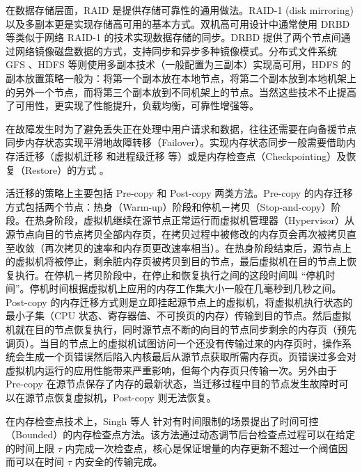 在数据存储层面，RAID \cite{Patterson:1988:CRA:50202.50214} 是提供存储可靠性的通用做法。RAID-1 (disk mirroring) 以及多副本更是实现存储高可用的基本方式。双机高可用设计中通常使用 DRBD \cite{DRBD:2015} 等类似于网络 RAID-1 的技术实现数据存储的同步。DRBD 提供了两个节点间通过网络镜像磁盘数据的方式，支持同步和异步多种镜像模式。分布式文件系统 GFS \cite{Ghemawat:2003:GFS:945445.945450}、HDFS \cite{Hadoop} 等则使用多副本技术（一般配置为三副本）实现高可用，HDFS 的副本放置策略一般为：将第一个副本放在本地节点，将第二个副本放到本地机架上的另外一个节点，而将第三个副本放到不同机架上的节点。当然这些技术不止提高了可用性，更实现了性能提升，负载均衡，可靠性增强等。

在故障发生时为了避免丢失正在处理中用户请求和数据，往往还需要在向备援节点同步内存状态实现平滑地故障转移（Failover）。实现内存状态同步一般需要借助内存活迁移（虚拟机迁移 \cite{Clark:2005:LMV:1251203.1251223} 和进程级迁移 \cite{Wang:2008:PPL:1413370.1413414} 等）或是内存检查点（Checkpointing）及恢复（Restore）的方式 \cite{Duell03thedesign, CRIU:2016}。

活迁移的策略上主要包括 Pre-copy 和 Post-copy 两类方法。Pre-copy 的内存迁移方式包括两个节点：热身（Warm-up）阶段和停机－拷贝（Stop-and-copy）阶段。在热身阶段，虚拟机继续在源节点正常运行而虚拟机管理器（Hypervisor）从源节点向目的节点拷贝全部内存页，在拷贝过程中被修改的内存页会再次被拷贝直至收敛（再次拷贝的速率和内存页更改速率相当）。在热身阶段结束后，源节点上的虚拟机将被停止，剩余脏内存页被拷贝到目的节点，最后虚拟机在目的节点上恢复执行。在停机－拷贝阶段中，在停止和恢复执行之间的这段时间叫 ``停机时间''。停机时间根据虚拟机上应用的内存工作集大小一般在几毫秒到几秒之间。Post-copy 的内存迁移方式则是立即挂起源节点上的虚拟机，将虚拟机执行状态的最小子集（CPU 状态、寄存器值、不可换页的内存）传输到目的节点。然后虚拟机就在目的节点恢复执行，同时源节点不断的向目的节点同步剩余的内存页（预先调页）。当目的节点上的虚拟机试图访问一个还没有传输过来的内存页时，操作系统会生成一个页错误然后陷入内核最后从源节点获取所需内存页。页错误过多会对虚拟机内运行的应用性能带来严重影响，但每个内存页只传输一次。另外由于 Pre-copy 在源节点保存了内存的最新状态，当迁移过程中目的节点发生故障时可以在源节点恢复虚拟机，Post-copy 则无法恢复。

在内存检查点技术上，Singh 等人 \cite{Singh:2013:YEG:2482626.2482642} 针对有时间限制的场景提出了时间可控（Bounded）的内存检查点方法。该方法通过动态调节后台检查点过程可以在给定的时间上限 $\tau$ 内完成一次检查点，核心是保证增量的内存更新不超过一个阀值因而可以在时间 $\tau$ 内安全的传输完成。

